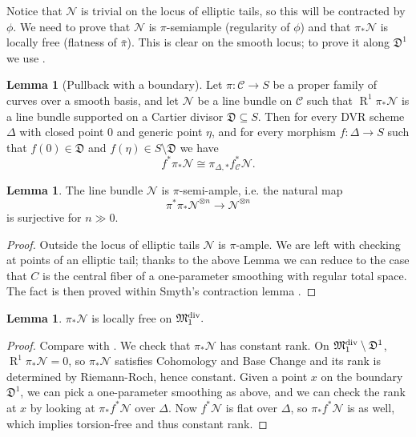 \documentclass[11pt]{amsart}
\renewcommand{\to}{\rightarrow}
\newcommand{\MM}{\mathfrak M}
\newcommand{\dvr}{\Delta}
\newcommand{\cC}{\mathcal{C}}
\theoremstyle{definition}
\newtheorem{lem}[thm]{Lemma}
\theoremstyle{definition}
\begin{document}
Notice that $\mathcal N$ is trivial on the locus of elliptic tails, so this will be contracted by $\phi$. We need to prove that $\mathcal N$ is $\pi$-semiample (regularity of $\phi$) and that $\pi_*\mathcal N$ is locally free (flatness of $\bar{\pi}$). This is clear on the smooth locus; to prove it along $\mathfrak D^1$ we use \cite[Lemmma~3.7.2.2]{RSPW}.
\begin{lem}[Pullback with a boundary]\label{DVR}
Let $\pi\colon\cC\to S$ be a proper family of curves over a smooth basis, and let $\mathcal N$ be a line bundle on $\cC$ such that $\operatorname{R}^1\pi_*\mathcal N$ is a line bundle supported on a Cartier divisor $\mathfrak D\subseteq S$. Then for every DVR scheme $\dvr$ with closed point $0$ and generic point $\eta$, and for every morphism $f\colon \dvr\to S$ such that $f(0)\in\mathfrak D$ and $f(\eta)\in S\setminus\mathfrak D$ we have
\[f^*\pi_*\mathcal N\cong \pi_{\dvr,*}f_\cC^*\mathcal N.\]
\end{lem}

\begin{lem}\label{lemma:semiample}
The line bundle $\mathcal N$ is $\pi$-semi-ample, i.e. the natural map
\[\pi^*\pi_*\mathcal N^{\otimes n}\to \mathcal N^{\otimes n}\]
is surjective for $n\gg 0$.
\end{lem}
\begin{proof}
Outside the locus of elliptic tails $\mathcal N$ is $\pi$-ample. We are left with checking at points of an elliptic tail; thanks to the above Lemma we can reduce to the case that $C$ is the central fiber of a one-parameter smoothing with regular total space. The fact is then proved within Smyth's contraction lemma \cite[Lemma~2.12]{SMY1}.
\end{proof}

\begin{lem}
$\pi_*\mathcal N$ is locally free on $\MM_1^{\rm{div}}.$
\end{lem}
\begin{proof} Compare with \cite[Proposition~3.7.2.1]{RSPW}.
We check that $\pi_*\mathcal N$ has constant rank.
On $\MM_1^{\rm{div}}\setminus \mathfrak{D}^1$, $\operatorname{R}^1\pi_*\mathcal N=0$, so $\pi_*\mathcal N$ satisfies Cohomology and Base Change \cite[Theorem III.12.11]{HAR} and its rank is determined by Riemann-Roch, hence constant.
Given a point $x$ on the boundary $\mathfrak{D}^1$, we can pick a one-parameter smoothing as above, and we can check the rank at $x$ by looking at $\pi_*f^*\mathcal N$ over $\dvr.$ Now $f^*\mathcal N$ is flat over $\dvr$, so $\pi_*f^*\mathcal N$ is as well, which implies torsion-free and thus constant rank.
\end{proof}
\end{document}
